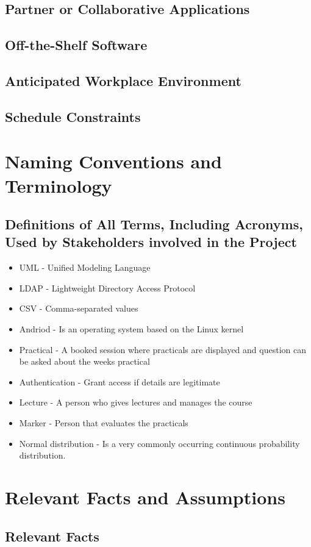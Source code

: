 \documentclass[12pt,a4paper]{article}
\begin{document}
\subsection{Partner or Collaborative Applications}
\subsection{Off-the-Shelf Software}
\subsection{Anticipated Workplace Environment}
\subsection{Schedule Constraints}
\pagebreak
\section{Naming Conventions and Terminology}
\subsection{Definitions of All Terms, Including Acronyms, Used by Stakeholders involved in the Project}
\begin{itemize}
\item UML - Unified Modeling Language
\item LDAP - Lightweight Directory Access Protocol
\item CSV - Comma-separated values
\item Andriod - Is an operating system based on the Linux kernel
\item Practical - A booked session where practicals are displayed and question can be asked about the weeks practical
\item Authentication - Grant access if details are legitimate
\item Lecture - A person who gives lectures and manages the course
\item Marker - Person that evaluates the practicals
\item Normal distribution - Is a very commonly occurring continuous probability distribution.
\end{itemize}
\pagebreak
\section{Relevant Facts and Assumptions}
\subsection{Relevant Facts}
\end{document}
